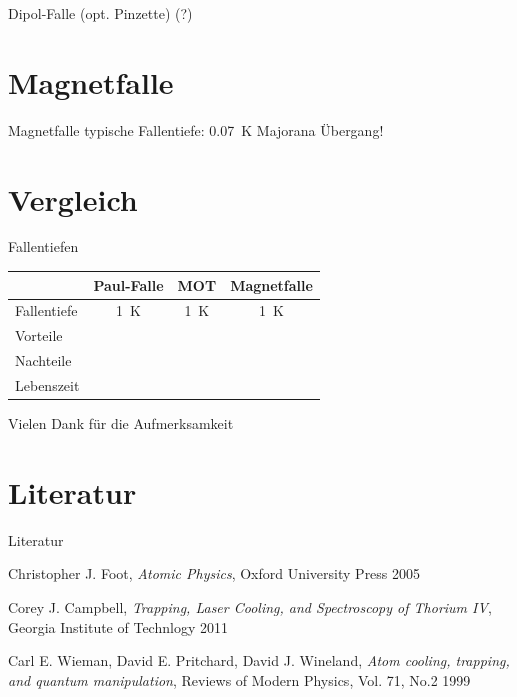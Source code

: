 \documentclass[12pt]{beamer}
\begin{document}
\begin{frame}{Dipol-Falle (opt. Pinzette) (?)}
\end{frame}


\section{Magnetfalle}

\begin{frame}{Magnetfalle}
typische Fallentiefe: \SI{0.07}{\kelvin}
Majorana Übergang!
\end{frame}


\section{Vergleich}

\begin{frame}{Fallentiefen}
	\begin{table}
	\begin{tabular}{l | c | c | c }
		& Paul-Falle & MOT & Magnetfalle \\
		\hline
		Fallentiefe & \SI{1}{K} & \SI{1}{K} & \SI{1}{K} \\
		Vorteile & & & \\
		Nachteile & & & \\
		Lebenszeit & & & \\
	\end{tabular}
	\end{table}

\end{frame}

\begin{frame}{Vielen Dank für die Aufmerksamkeit}
\end{frame}

\section{Literatur}

\begin{frame}{Literatur}
	\begin{thebibliography}{9}
		Christopher J. Foot,
		\emph{Atomic Physics},
		Oxford University Press 2005
		
		Corey J. Campbell,
		\emph{Trapping, Laser Cooling, and Spectroscopy of Thorium IV},
		Georgia Institute of Technlogy 2011
		
		Carl E. Wieman, David E. Pritchard, David J. Wineland,
		\emph{Atom cooling, trapping, and quantum manipulation},
		Reviews of Modern Physics, Vol. 71, No.2 1999
		
	\end{thebibliography}
	
\end{frame}
\end{document}
